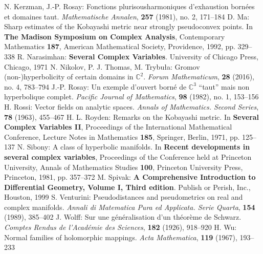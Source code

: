 \begin{thebibliography}{widest entry}
   N. Kerzman, J.-P. Rosay: Fonctions plurisousharmoniques d'exhaustion bornées et domaines taut. \textit{Mathematische Annalen}, \textbf{257} (1981), no. 2, 171--184
   D. Ma: Sharp estimates of the Kobayashi metric near strongly pseudoconvex points. In \textbf{The Madison Symposium on Complex Analysis}, Contemporary Mathematics \textbf{187}, American Mathematical Society, Providence, 1992, pp. 329--338
   R. Narasimhan: \textbf{Several Complex Variables}. University of Chicago Press, Chicago, 1971
   N. Nikolov, P. J. Thomas, M. Trybuła: Gromov (non-)hyperbolicity of certain domains in $\mathbb{C}^2$. \textit{Forum Mathematicum}, \textbf{28} (2016), no. 4, 783--794
   J.-P. Rosay: Un exemple d'ouvert borné de $\mathbb{C}^3$ ``taut'' mais non hyperbolique complet. \textit{Pacific Journal of Mathematics}, \textbf{98} (1982), no. 1, 153--156
   H. Rossi: Vector fields on analytic spaces. \textit{Annals of Mathematics. Second Series}, \textbf{78} (1963), 455--467
   H. L. Royden: Remarks on the Kobayashi metric. In \textbf{Several Complex Variables II}, Proceedings of the International Mathematical Conference, Lecture Notes in Mathematics \textbf{185}, Springer, Berlin, 1971, pp. 125--137
   N. Sibony: A class of hyperbolic manifolds. In \textbf{ Recent developments in several complex variables}, Proceedings of the Conference held at Princeton University, Annals of Mathematics Studies \textbf{100}, Princeton University Press, Princeton, 1981, pp. 357--372
   M. Spivak: \textbf{A Comprehensive Introduction to Differential Geometry, Volume I, Third edition}. Publish or Perish, Inc., Houston, 1999
   S. Venturini: Pseudodistances and pseudometrics on real and complex manifolds. \textit{Annali di Matematica Pura ed Applicata. Serie Quarta}, \textbf{154} (1989), 385--402
   J. Wolff: Sur une généralisation d'un théorème de Schwarz. \textit{Comptes Rendus de l'Académie des Sciences}, \textbf{182} (1926), 918--920
   H. Wu: Normal families of holomorphic mappings. \textit{Acta Mathematica}, \textbf{119} (1967), 193--233
\end{thebibliography}
